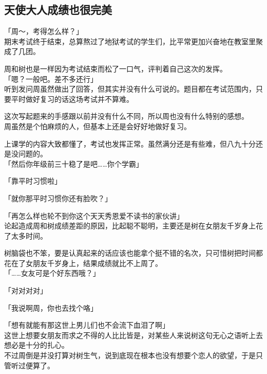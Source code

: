 \subsection{天使大人成绩也很完美}

「周～，考得怎么样？」\\

期末考试终于结束，总算熬过了地狱考试的学生们，比平常更加兴奋地在教室里聚成了几团。

周和树也是一样因为考试结束而松了一口气，评判着自己这次的发挥。\\

「嗯？一般吧。差不多还行」\\

听到发问周虽然做出了回答，但其实并没有什么可说的。题目都在考试范围内，只要平时做好复习的话这场考试并不算难。

这次写起题来的手感跟以前并没有什么不同，所以周也没有什么特别的感想。\\

周虽然是个怕麻烦的人，但基本上还是会好好地做好复习。

上课学的内容大致都懂了，考试也发挥正常。虽然满分还是有些难，但八九十分还是没问题的。\\

「然后你年级前三十稳了是吧……你个学霸」

「靠平时习惯啦」

「就你那平时习惯你还有脸吹？」

「再怎么样也轮不到你这个天天秀恩爱不读书的家伙讲」\\

论起造成周和树成绩差距的原因，比起聪不聪明，主要还是树在女朋友千岁身上花了太多时间。

树脑袋也不笨，要是认真起来的话应该也能拿个挺不错的名次，只可惜树把时间都花在了女朋友千岁身上，结果成绩就比不上周了。\\

「……女友可是个好东西哦？」

「对对对对」

「我说啊周，你也去找个咯」

「想有就能有那这世上男儿们也不会流下血泪了啊」\\

这世上想要女朋友而求之不得的人比比皆是，对某些人来说树这句无心之语听上去想必是十分的扎心。\\

不过周倒是并没打算对树生气，说到底现在根本也没有想要个恋人的欲望，于是只管听过便算了。\\

